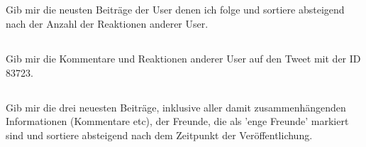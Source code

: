 \subsection{}
Gib mir die neusten Beiträge der User denen ich folge und sortiere absteigend nach der Anzahl der Reaktionen anderer User.

\subsection{}
Gib mir die Kommentare und Reaktionen anderer User auf den Tweet mit der ID 83723.

\subsection{}
Gib mir die drei neuesten Beiträge, inklusive aller damit zusammenhängenden Informationen (Kommentare etc), der Freunde, die als 'enge Freunde' markiert sind und sortiere absteigend nach dem Zeitpunkt der Veröffentlichung.

\printbibliography %


